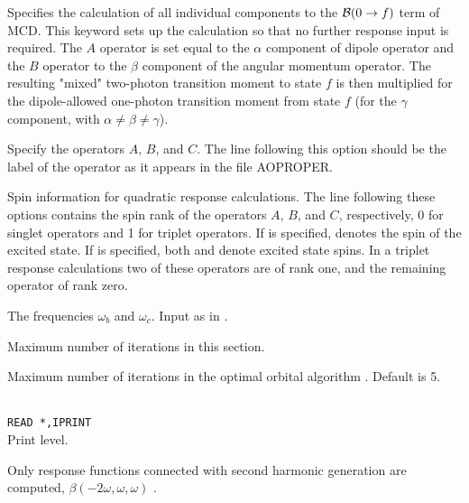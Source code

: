 \begin{description}
\item{}
Specifies the calculation of all individual components to the 
${\cal{B}}(0\to f)$ term of 
MCD.
This keyword sets up the calculation so that no further response input is required. 
The $A$ operator is set equal to the $\alpha$ component of dipole 
operator and
the $B$ operator to the $\beta$ component of the angular momentum
operator. The resulting "mixed" two-photon transition moment to state $f$ 
is then multiplied for the dipole-allowed one-photon transition moment 
from state $f$ (for the $\gamma$ component, with $\alpha \neq \beta \neq \gamma$).
\cite{Coriani:MCDRSP} 

\item[\Key{APROP}, \Key{BPROP}, \Key{CPROP}]
Specify the operators $A$, $B$, and $C$. The line following this
option should be the label of the operator as it appears in the file
AOPROPER.

\item[\Key{ASPIN}, \Key{BSPIN}, \Key{CSPIN}]
Spin information for quadratic response calculations.
The line following these options contains the spin
rank of the operators 
$A$, $B$, and $C$, respectively, 0 for singlet operators and 1 for triplet
operators. If  is specified,  denotes the
spin of the excited state. If  is specified,
both  and  denote excited state spins.
In a triplet response calculations two of these operators are of rank one,
and the remaining operator of rank zero.


\item[\Key{BFREQ}, \Key{CFREQ}]
The frequencies $\omega_b$ and $\omega_c$. Input as in
.

\item{}
Maximum number of iterations in this section.

\item{}
Maximum number of iterations in the optimal
orbital algorithm 
\cite{tuhjahjajpjjcp84}. 
Default is 5.

\item{}\\
\verb|READ *,IPRINT|\\
Print level.

\item{}
Only response functions connected with second harmonic
generation 
are computed, $\beta(-2\omega,\omega,\omega)$ .


\end{description}
